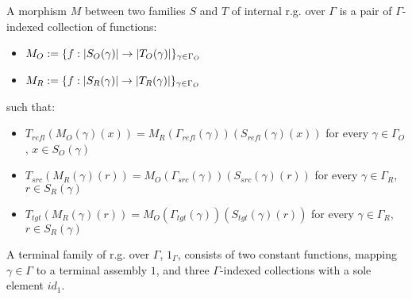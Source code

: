 \documentclass[12pt,a4paper]{article}
\def\src{_{src}}\alwaysmath{src}
\def\rfl{_{refl}}\alwaysmath{rfl}
\def\tgt{_{tgt}}\alwaysmath{tgt}
\renewcommand{\O}{_{O}}\alwaysmath{O}
\def\R{_{R}}\alwaysmath{R}
\begin{document}
A morphism $M$ between two families $S$ and $T$ of internal r.g. over $\Gamma$ is a pair of $\Gamma$-indexed collection of functions:
\begin{itemize}[noitemsep]
  \item $M\O \define \{f : \carr{S\O(\gamma)} \to \carr{T\O(\gamma)} \}_{\gamma \in \Gamma\O}$
  \item $M\R \define \{f : \carr{S\R(\gamma)} \to \carr{T\R(\gamma)} \}_{\gamma \in \Gamma\O}$
\end{itemize}
such that:
\begin{itemize}[noitemsep]
  \item $T\rfl(M\O (\gamma)(x)) = M\R(\Gamma\rfl(\gamma))(S\rfl(\gamma)(x))$ for every $\gamma \in \Gamma\O$, $x \in S\O(\gamma)$
  \item $T\src(M\R (\gamma)(r)) = M\O(\Gamma\src(\gamma))(S\src(\gamma)(r))$ for every $\gamma \in \Gamma\R$, $r \in S\R(\gamma)$
  \item $T\tgt(M\R (\gamma)(r)) = M\O(\Gamma\tgt(\gamma))(S\tgt(\gamma)(r))$ for every $\gamma \in \Gamma\R$, $r \in S\R(\gamma)$
  
\end{itemize}

A terminal family of r.g. over $\Gamma$, $1_\Gamma$,  consists of two constant functions, mapping $\gamma\in\Gamma$ to a terminal assembly $1$, and three $\Gamma$-indexed collections with a sole element $id_1$.\\

\end{document}
